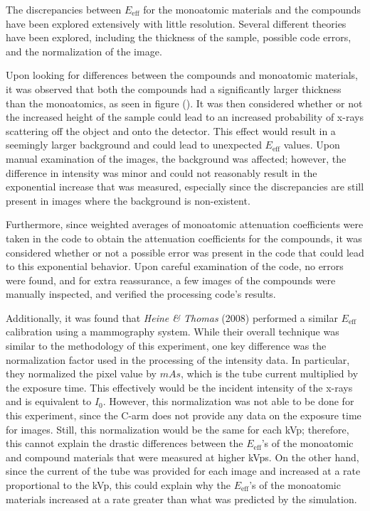 The discrepancies between $E_{\text{eff}}$ for the monoatomic materials and the compounds have been explored extensively with little resolution. Several different theories have been explored, including the thickness of the sample, possible code errors, and the normalization of the image.

Upon looking for differences between the compounds and monoatomic materials, it was observed that both the compounds had a significantly larger thickness than the monoatomics, as seen in figure (). It was then considered whether or not the increased height of the sample could lead to an increased probability of x-rays scattering off the object and onto the detector. This effect would result in a seemingly larger background and could lead to unexpected $E_{\text{eff}}$ values. Upon manual examination of the images, the background was affected; however, the difference in intensity was minor and could not reasonably result in the exponential increase that was measured, especially since the discrepancies are still present in images where the background is non-existent.

Furthermore, since weighted averages of monoatomic attenuation coefficients were taken in the code to obtain the attenuation coefficients for the compounds, it was considered whether or not a possible error was present in the code that could lead to this exponential behavior. Upon careful examination of the code, no errors were found, and for extra reassurance, a few images of the compounds were manually inspected, and verified the processing code's results.

Additionally, it was found that \textit{Heine \& Thomas} (2008) performed a similar $E_{\text{eff}}$ calibration using a mammography system. While their overall technique was similar to the methodology of this experiment, one key difference was the normalization factor used in the processing of the intensity data. In particular, they normalized the pixel value by $mAs$, which is the tube current multiplied by the exposure time. This effectively would be the incident intensity of the x-rays and is equivalent to $I_0$. However, this normalization was not able to be done for this experiment, since the C-arm does not provide any data on the exposure time for images. Still, this normalization would be the same for each kVp; therefore, this cannot explain the drastic differences between the $E_{\text{eff}}$'s of the monoatomic and compound materials that were measured at higher kVps. On the other hand, since the current of the tube was provided for each image and increased at a rate proportional to the kVp, this could explain why the $E_{\text{eff}}$'s of the monoatomic materials increased at a rate greater than what was predicted by the simulation. 

